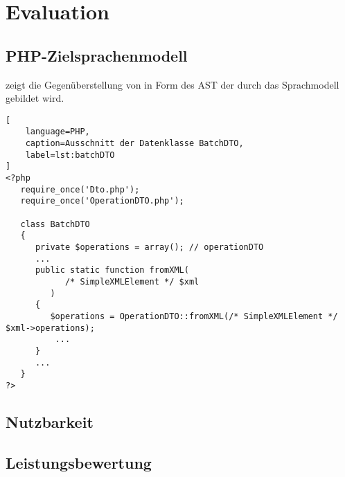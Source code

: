 \chapter{Evaluation}
\label{chap:evaluation}



\section{PHP-Zielsprachenmodell}
\label{sec:php_target_language_model}

 zeigt die Gegenüberstellung von  in Form des \gls{AST} der durch das Sprachmodell gebildet wird. 

\begin{lstlisting}[
    language=PHP,
    caption=Ausschnitt der Datenklasse BatchDTO,
    label=lst:batchDTO
]
<?php
   require_once('Dto.php');
   require_once('OperationDTO.php');

   class BatchDTO
   {
      private $operations = array(); // operationDTO 
      ...
      public static function fromXML(
            /* SimpleXMLElement */ $xml
         )
      {
         $operations = OperationDTO::fromXML(/* SimpleXMLElement */ $xml->operations);
          ...
      }
      ...
   }
?>
\end{lstlisting}

\begin{sidewaysfigure}
    \centering
    \resizebox{1.05\textheight}{!}{
      
    }
    \caption{Darstellung von BatchDTO aus  im Sprachenmodell}
    \label{fig:modelRepresentationOfBatchDTO}
\end{sidewaysfigure}

\section{Nutzbarkeit}
\label{sec:usability}

\section{Leistungsbewertung}
\label{sec:performance_measurement}

